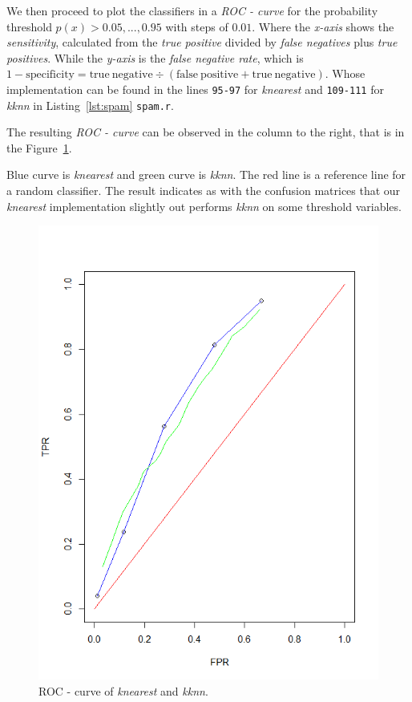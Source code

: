 \documentclass[a4paper, twocolumn]{article}
\begin{document}
    We then proceed to plot the classifiers in a \textit{ROC - curve} for the probability threshold \( p(x) > 0.05,...,0.95\) with steps of \(0.01\). Where the \emph{x-axis} shows the \emph{sensitivity}, calculated from the \emph{true positive} divided by \emph{false negatives} plus \emph{true positives}. While the \emph{y-axis} is the \emph{false negative rate}, which is $1 - \mathrm{specificity} = \mathrm{true\ negative} \div (\mathrm{false\ positive} + \mathrm{true\ negative})$. Whose implementation can be found in the lines \texttt{95-97} for \emph{knearest} and \texttt{109-111} for \emph{kknn} in Listing~\ref{lst:spam} \texttt{spam.r}.

    The resulting \textit{ROC - curve} can be observed in the column to the right, that is in the Figure~\ref{fig:roc}.

    Blue curve is \textit{knearest} and green curve is \textit{kknn}. The red line is a reference line for a random classifier. The result indicates as with the confusion matrices that our \textit{knearest} implementation slightly out performs \textit{kknn} on some threshold variables.

\begin{figure}[H]
\centering
\begin{minipage}[]{0.5\textwidth}
  \includegraphics[width=\textwidth]{share/Lab1_A1_ROC.png}  
  \caption{ROC - curve of  \textit{knearest} and  \textit{kknn}.\label{fig:roc} }
 \end{minipage}
\end{figure}
\end{document}
